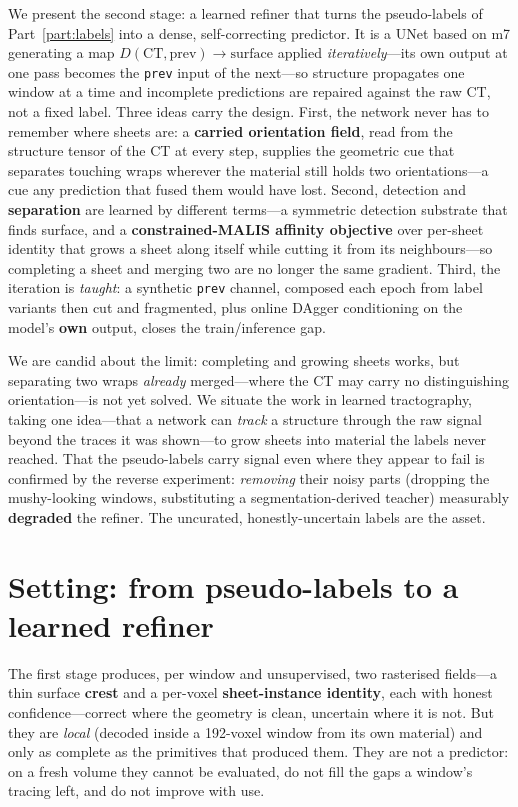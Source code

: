 \documentclass[10pt,twocolumn,a4paper]{article}
\newcommand{\code}[1]{\texttt{#1}}
\begin{document}
We present the second stage: a learned refiner that turns the pseudo-labels of
Part~\ref{part:labels} into a dense, self-correcting predictor. It is a UNet based
on m7 generating a map $D(\mathrm{CT},\mathrm{prev})\to\mathrm{surface}$ applied
\emph{iteratively}---its own output at one pass becomes the \code{prev} input of
the next---so structure propagates one window at a time and incomplete predictions
are repaired against the raw CT, not a fixed label. Three ideas carry the design.
First, the network never has to remember where sheets are: a \textbf{carried
orientation field}, read from the structure tensor of the CT at every step,
supplies the geometric cue that separates touching wraps wherever the material
still holds two orientations---a cue any prediction that fused them would have
lost. Second, detection and \textbf{separation} are learned by different terms---a
symmetric detection substrate that finds surface, and a \textbf{constrained-MALIS
affinity objective} over per-sheet identity that grows a sheet along itself while
cutting it from its neighbours---so completing a sheet and merging two are no
longer the same gradient. Third, the iteration is \emph{taught}: a synthetic
\code{prev} channel, composed each epoch from label variants then cut and
fragmented, plus online DAgger conditioning on the model's \textbf{own} output,
closes the train/inference gap.

We are candid about the limit: completing and growing sheets works, but separating
two wraps \emph{already} merged---where the CT may carry no distinguishing
orientation---is not yet solved. We situate the work in learned tractography,
taking one idea---that a network can \emph{track} a structure through the raw
signal beyond the traces it was shown---to grow sheets into material the labels
never reached. That the pseudo-labels carry signal even where they appear to fail
is confirmed by the reverse experiment: \emph{removing} their noisy parts (dropping
the mushy-looking windows, substituting a segmentation-derived teacher) measurably
\textbf{degraded} the refiner. The uncurated, honestly-uncertain labels are the
asset.

\section{Setting: from pseudo-labels to a learned refiner}
The first stage produces, per window and unsupervised, two rasterised fields---a
thin surface \textbf{crest} and a per-voxel \textbf{sheet-instance identity}, each
with honest confidence---correct where the geometry is clean, uncertain where it
is not. But they are \emph{local} (decoded inside a 192-voxel window from its own
material) and only as complete as the primitives that produced them. They are not
a predictor: on a fresh volume they cannot be evaluated, do not fill the gaps a
window's tracing left, and do not improve with use.
\end{document}
